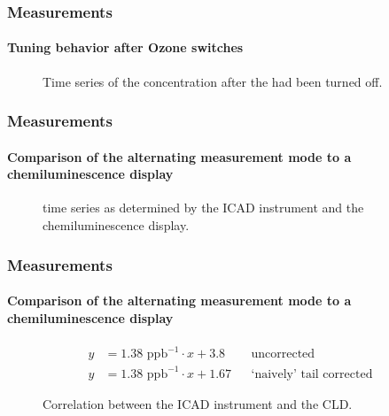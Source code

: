 \documentclass[english]{beamer}
\begin{document}
\begin{frame}
  \frametitle{Measurements}
  \framesubtitle{Tuning behavior after Ozone switches}
  \begin{figure}[htbp]
    \centering
    \scalebox{.6}{
      
    }
    \caption{Time series of the  concentration after the
       had been turned off.}
    \label{fig:flow}
  \end{figure}
\end{frame}

\begin{frame}
  \frametitle{Measurements}
  \framesubtitle{Comparison of the alternating measurement mode to a
    chemiluminescence display}
    \begin{figure}[htbp]
    \centering
    \scalebox{.7}{
      
    }
    \hspace{1cm}
    \scalebox{.7}{
      
    }
    \caption{ time series as determined by the ICAD instrument
      and the chemiluminescence display.}
    \label{fig:flow}
  \end{figure}
\end{frame}

\begin{frame}
  \frametitle{Measurements}
  \framesubtitle{Comparison of the alternating measurement mode to a
    chemiluminescence display}
  \begin{align*}
    y & = 1.38\text{ ppb}^{-1} \cdot x + 3.8 && \text{uncorrected}\\
    y & = 1.38\text{ ppb}^{-1} \cdot x + 1.67 && \text{`naively' tail corrected} 
  \end{align*}
  \begin{figure}[htbp]
    \centering
    \scalebox{.55}{
      
    }
    \caption{Correlation between the ICAD instrument and the
      CLD.}
    \label{fig:flow}
  \end{figure}
\end{frame}

%       
\end{document}

